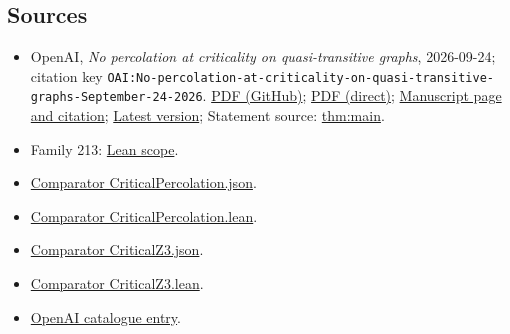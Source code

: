 \documentclass[11pt]{article}
\begin{document}
\subsection{Sources}
\begin{itemize}
\item OpenAI, \emph{No percolation at criticality on quasi-transitive graphs}, 2026-09-24; citation key \texttt{OAI:No-percolation-at-criticality-on-quasi-transitive-graphs-September-24-2026}. \href{https://github.com/openai/math/blob/adc7f1241b42e322a6451854ab7e4b4c146bf78a/preprints/No-percolation-at-criticality-on-quasi-transitive-graphs-September-24-2026/paper.pdf}{PDF (GitHub)}; \href{https://github.com/openai/math/raw/adc7f1241b42e322a6451854ab7e4b4c146bf78a/preprints/No-percolation-at-criticality-on-quasi-transitive-graphs-September-24-2026/paper.pdf}{PDF (direct)}; \href{https://github.com/openai/math/blob/adc7f1241b42e322a6451854ab7e4b4c146bf78a/preprints/No-percolation-at-criticality-on-quasi-transitive-graphs-September-24-2026/README.md}{Manuscript page and citation}; \href{https://github.com/openai/math/blob/main/preprints/No-percolation-at-criticality-on-quasi-transitive-graphs-September-24-2026/paper.pdf}{Latest version}; Statement source: \href{https://github.com/openai/math/blob/adc7f1241b42e322a6451854ab7e4b4c146bf78a/preprints/No-percolation-at-criticality-on-quasi-transitive-graphs-September-24-2026/build/sections/introduction.tex\#L26}{thm:main}.
\item Family 213: \href{https://github.com/openai/math/blob/adc7f1241b42e322a6451854ab7e4b4c146bf78a/lean/docs/213.md}{Lean scope}.
\item \href{https://github.com/openai/math/blob/adc7f1241b42e322a6451854ab7e4b4c146bf78a/lean/ComparatorChallenges/CriticalPercolation.json}{Comparator CriticalPercolation.json}.
\item \href{https://github.com/openai/math/blob/adc7f1241b42e322a6451854ab7e4b4c146bf78a/lean/ComparatorChallenges/CriticalPercolation.lean}{Comparator CriticalPercolation.lean}.
\item \href{https://github.com/openai/math/blob/adc7f1241b42e322a6451854ab7e4b4c146bf78a/lean/ComparatorChallenges/CriticalZ3.json}{Comparator CriticalZ3.json}.
\item \href{https://github.com/openai/math/blob/adc7f1241b42e322a6451854ab7e4b4c146bf78a/lean/ComparatorChallenges/CriticalZ3.lean}{Comparator CriticalZ3.lean}.
\item \href{https://github.com/openai/math/blob/adc7f1241b42e322a6451854ab7e4b4c146bf78a/CONTENTS.md}{OpenAI catalogue entry}.
\end{itemize}
\end{document}

